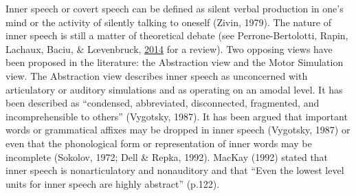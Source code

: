 \documentclass[a4paper,12pt,twoside,openright,oldfontcommands]{memoir}
\begin{document}
Inner speech or covert speech can be defined as silent verbal production
in one's mind or the activity of silently talking to oneself (Zivin,
1979). The nature of inner speech is still a matter of theoretical
debate (see Perrone-Bertolotti, Rapin, Lachaux, Baciu, \& Lœvenbruck,
\protect\hyperlink{ref-Perrone-Bertolotti2014}{2014} for a review). Two
opposing views have been proposed in the literature: the Abstraction
view and the Motor Simulation view. The Abstraction view describes inner
speech as unconcerned with articulatory or auditory simulations and as
operating on an amodal level. It has been described as ``condensed,
abbreviated, disconnected, fragmented, and incomprehensible to others''
(Vygotsky, 1987). It has been argued that important words or grammatical
affixes may be dropped in inner speech (Vygotsky, 1987) or even that the
phonological form or representation of inner words may be incomplete
(Sokolov, 1972; Dell \& Repka, 1992). MacKay (1992) stated that inner
speech is nonarticulatory and nonauditory and that ``Even the lowest
level units for inner speech are highly abstract'' (p.122).
\end{document}
